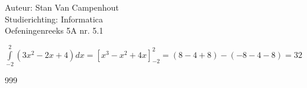 \documentclass[a4paper]{article}
\begin{document}
  
\noindent \large Auteur: Stan Van Campenhout \\
\noindent \large Studierichting:  Informatica\\
\noindent \large Oefeningenreeks 5A nr. 5.1\\

\medskip

\normalsize

$ \displaystyle\int\limits_{-2}^2\left(3x^2-2x+4\right) dx = \left[x^3-x^2+4x\right]_{-2}^2 = \left(8-4+8\right)-\left(-8-4-8\right) = 32 $\\

\begin{thebibliography}{999}
\end{thebibliography}
\end{document}
